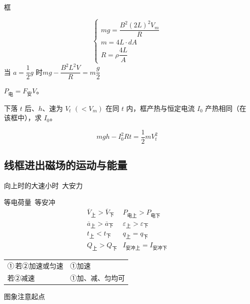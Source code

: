\begin{problem}[⑤]
框 %
\begin{solution}
\[ \left\{\begin{array}{l}
mg=\dfrac{B^2(2L)^2V_m}{R}\\[2.5ex]
m=4L\cdot dA\\[1ex]
R=\rho\dfrac{4L}{A}
\end{array}\right. \]
\qquad 当 $a=\dfrac{1}{2}g$ 时\quad $mg-\dfrac{B^2L^2V}{R}=m\dfrac{g}{2}$

$P_{\text{电}}=F_{\text{安}}V$。 %
\end{solution}
下落 $t$ 后、$h$、速为 $V_t$ $(<V_m)$ 在同 $t$ 内，框产热与恒定电流 $I_0$ 产热相同（在该框中），求 $I_0$。
\begin{solution}
\[ mgh-I_0^2Rt=\frac{1}{2}mV_t^2 \]
\end{solution}
\end{problem}

\subsection{线框进出磁场的运动与能量}
向上时的大速小时\ 大安力

等电荷量\ 等安冲
\[ \begin{array}{ll}
\overline{V}_{\text{上}}>\overline{V}_{\text{下}} & P_{\text{电上}}>P_{\text{电下}}\\
\overline{a}_{\text{上}}>\overline{a}_{\text{下}} & \varepsilon_{\text{上}}>\varepsilon_{\text{下}}\\
t_{\text{上}}<t_{\text{下}} & q_{\text{上}}=q_{\text{下}}\\
Q_{\text{上}}>Q_{\text{下}} & I_{\text{安冲上}}=I_{\text{安冲下}}
\end{array} \] %

\begin{tabular}{@{}l@{\qquad}l@{}}
①\,若②加速或匀速 & ①加速\\
\hphantom{①\,}若②减速 & ①加、减、匀均可
\end{tabular}

图象注意起点

